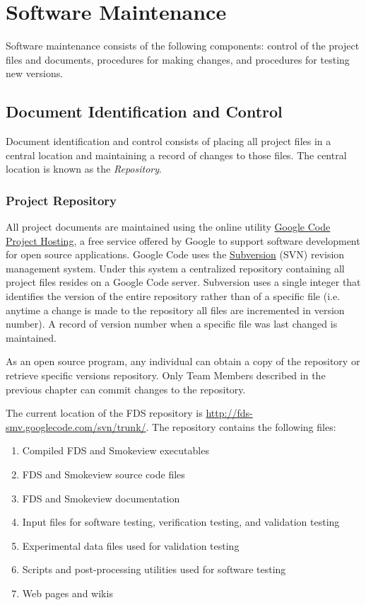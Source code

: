 \documentclass[11pt]{book}
\begin{document}
\chapter{Software Maintenance}

Software maintenance consists of the following components:
control of the project files and documents, procedures for making changes, and procedures for testing new versions.


\section{Document Identification and Control}

Document identification and control consists of placing all project files in a central location and maintaining a record of changes to those files.
The central location is known as the {\em Repository}.


\subsection{Project Repository}

All project documents are maintained using the online utility \href{http://code.google.com/opensource}{{Google Code Project Hosting}}, a free service
offered by Google to support software development for open source applications.  Google Code uses the \href{http://subversion.tigris.org}{{Subversion}} (SVN) revision management system.
Under this system a centralized repository containing all project files resides on a Google Code server.
Subversion uses a single integer that identifies the version of the entire repository rather than of a specific file
(i.e. anytime a change is made to the repository all files are incremented in version number).  A record of version number when a specific file was last changed is maintained.

As an open source program, any individual can obtain a copy of the repository or retrieve specific versions
repository.  Only Team Members described in the previous chapter can commit changes to the repository.

The current location of the FDS repository is \href{http://fds-smv.googlecode.com/svn/trunk/}
{{\ct http://fds-smv.googlecode.com/svn/trunk/}}. The repository contains the following files:
\begin{enumerate}
\item Compiled FDS and Smokeview executables
\item FDS and Smokeview source code files
\item FDS and Smokeview documentation
\item Input files for software testing, verification testing, and validation testing
\item Experimental data files used for validation testing
\item Scripts and post-processing utilities used for software testing
\item Web pages and wikis
\end{enumerate}
\end{document}
